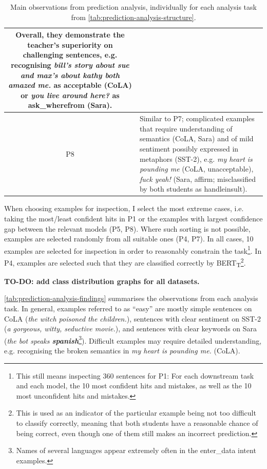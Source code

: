 \documentclass[bsc,frontabs,singlespacing,parskip,deptreport]{infthesis}
\def\BERTT{BERT\textsubscript{T}}
\begin{document}
{{\begin{table}[h!tb]
{\begin{tabular}{|c|m{15cm}|}
      Overall, they demonstrate the teacher's superiority on challenging sentences, e.g. recognising \textit{bill's story about sue and max's about kathy both amazed me.} as acceptable (CoLA) or \textit{you live around here?} as ask\_wherefrom (Sara).
      \\ \hline
      P8 &
      Similar to P7; complicated examples that require understanding of semantics (CoLA, Sara) and of mild sentiment possibly expressed in metaphors (SST-2), e.g.
      \textit{my heart is pounding me} (CoLA, unacceptable), \textit{fuck yeah!} (Sara, affirm; misclassified by both students as handleinsult).
      \\ \hline
      \end{tabular}}
      \caption{Main observations from prediction analysis, individually for each analysis task from \autoref{tab:prediction-analysis-structure}.}
      \label{tab:prediction-analysis-findings}
    \end{table}

    When choosing examples for inspection, I select the most extreme cases, i.e. taking the most/least confident hits in P1 or the examples with largest confidence gap between the relevant models (P5, P8).
    Where such sorting is not possible, examples are selected randomly from all suitable ones (P4, P7).
    In all cases, 10 examples are selected for inspection in order to reasonably constrain the task\footnote{This still means inspecting 360 sentences for P1: For each downstream task and each model, the 10 most confident hits and mistakes, as well as the 10 most unconfident hits and mistakes.}.
    In P4, examples are selected such that they are classified correctly by \BERTT\footnote{This is used as an indicator of the particular example being not too difficult to classify correctly, meaning that both students have a reasonable chance of being correct, even though one of them still makes an incorrect prediction.}.

    \textbf{TO-DO: add class distribution graphs for all datasets.}
    
    \autoref{tab:prediction-analysis-findings} summarises the observations from each analysis task. In general, examples referred to as ``easy'' are mostly simple sentences on CoLA (\textit{the witch poisoned the children.}), sentences with clear sentiment on SST-2 (\textit{a gorgeous, witty, seductive movie.}), and sentences with clear keywords on Sara (\textit{the bot speaks \textbf{spanish}}\footnote{Names of several languages appear extremely often in the enter\_data intent examples.}). Difficult examples may require detailed understanding, e.g. recognising the broken semantics in \textit{my heart is pounding me.} (CoLA).

}}
\end{document}
